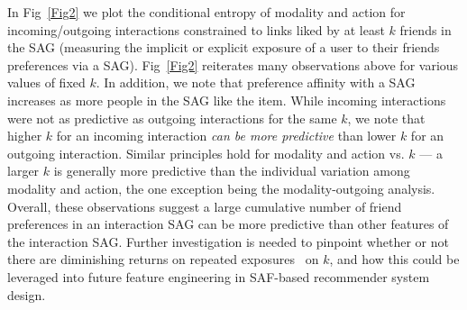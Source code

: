 In Fig~\ref{Fig2} we plot the conditional entropy of modality and
action for incoming/outgoing interactions constrained to links
liked by at least $k$ friends in the SAG (measuring the implicit or explicit
exposure of a user to their friends preferences via a SAG).  Fig~\ref{Fig2} reiterates
many observations above for various values of fixed $k$.  In addition, we note that
preference affinity with a SAG increases as more people in the SAG
like the item. 
While incoming interactions were not as predictive as outgoing
interactions for the same $k$, we note that higher $k$ for an incoming
interaction \emph{can be more predictive} than lower $k$ for an outgoing
interaction.  Similar principles hold for modality and action vs. $k$ --- a larger $k$
is generally more predictive than the individual variation among modality and action,
the one exception being the modality-outgoing analysis.
Overall, these observations 
suggest a large cumulative number of friend preferences in an interaction SAG can be more predictive
than other features of the interaction SAG.
Further investigation is needed to pinpoint whether or not there are
diminishing returns on repeated
exposures~\cite{Romero2011hashtag,ver2011stops} on $k$, and how this
could be leveraged into future feature engineering in SAF-based
recommender system design.



